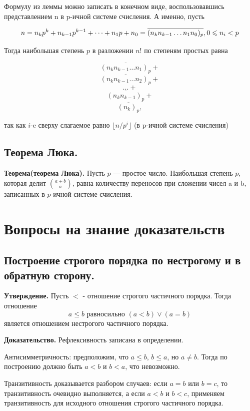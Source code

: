 \documentclass[a4paper, 10pt]{article}
\begin{document}
Формулу из леммы можно записать в конечном виде, воспользовавшись
представлением n в p-ичной системе счисления. А именно, пусть

$$\Huge n = n_kp^k + n_{k - 1}p^{k - 1} + \dots + n_{1}p + n_0 = \overline{(n_kn_{k-1} \dots n_1n_0)_p}, 0 \leqslant n_i < p$$

Тогда наибольшая степень $p$ в разложении $n!$ по степеням простых равна

$$\overline{(n_kn_{k-1} \dots n_1)_p} + $$
$$\overline{(n_kn_{k-1} \dots n_2)_p} + $$
$$\dots + $$
$$\overline{(n_kn_{k-1})_p} +$$
$$\overline{(n_k)_p},$$

так как $i$-e сверху слагаемое равно $\lfloor n/p^i \rfloor$ (в p-ичной системе счисления)


\subsection{Теорема Люка.}

\textbf{Теорема(теорема Люка).} Пусть $p$ — простое число. Наибольшая степень $p$, которая делит $\binom{a + b}{a}$, равна количеству переносов при сложении чисел a и b, записанных в $p$-ичной системе счисления.




\section{Вопросы на знание доказательств}

\subsection{Построение строгого порядка по нестрогому и в обратную сторону.}

\textbf{Утверждение.} Пусть $<$ - отношение строгого частичного порядка. Тогда отношение $$a \leqslant b \text{ равносильно } (a < b) \vee (a = b)$$ является отношением нестрогого частичного порядка.

\textbf{Доказательство.} Рефлексивность записана в определении.

Антисимметричность: предположим, что $a \leqslant b$, $b \leqslant a$, но $a \neq b$. Тогда по построению должно быть $a < b$ и $b < a$, что невозможно.

Транзитивность доказывается разбором случаев: если $a = b$ или $b = c$, то транзитивность очевидно выполняется, а если $a < b$ и $b < c$, применяем транзитивность для исходного отношения строгого частичного порядка. \\
\end{document}
